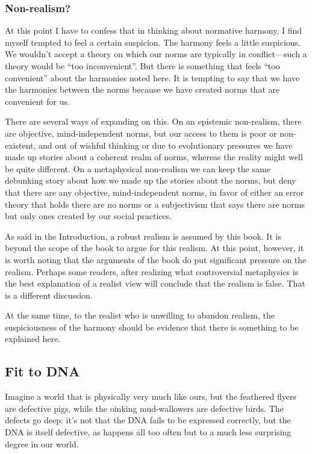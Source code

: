 \subsubsection{Non-realism?}\label{sec:non-realism}
At this point I have to confess that in thinking about normative harmony, I find myself tempted to feel 
a certain suspicion. The harmony feels a little suspicious. We wouldn't accept a theory on which
our norms are typically in conflict---such a theory would be ``too inconvenient''. But there is something 
that feels ``too convenient'' about the harmonies noted here. It is tempting to say that we have 
the harmonies between the norms because we have created norms that are convenient for us.

There are several ways of expanding on this. On an epistemic non-realism, there are objective, mind-independent norms, but 
our access to them is poor or non-existent, and out of wishful thinking or due to evolutionary pressures we have made 
up stories about a coherent realm of norms, whereas the reality might well be quite different. On a metaphysical non-realism 
we can keep the same debunking story about how we made up the stories about the norms, but deny that there are any 
objective, mind-independent norms, in favor of either an error theory that holds there are no norms or a subjectivism
that says there are norms but only ones created by our social practices. 

As said in the Introduction, a robust realism is assumed by this book. It is beyond the scope of the book to argue for 
this realism. At this point, however, it is worth noting that the arguments of the book do put significant pressure 
on the realism. Perhaps some readers, after realizing what controversial metaphysics is the best explanation of a realist
view will conclude that the realism is false. That is a different discussion.

At the same time, to the realist who is unwilling to abandon realism, the suspiciousness of the harmony should be 
evidence that there is something to be explained here. 

\subsection{Fit to DNA}
Imagine a world that is physically very much like ours, but the feathered flyers are defective
pigs, while the oinking mud-wallowers are defective birds. The defects go deep: it's not that the DNA fails
to be expressed correctly, but the DNA is itself defective, as happens all too often but to a much less
surprising degree in our world.

